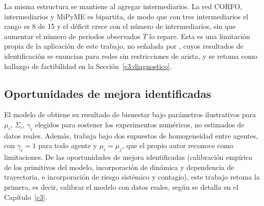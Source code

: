 La misma estructura se mantiene al agregar intermediarios. La red CORFO, intermediarios y MiPyME es bipartita, de modo que con tres intermediarios el rango es 8 de 15 y el déficit crece con el número de intermediarios, sin que aumentar el número de periodos observados $T$ lo repare. Esta es una limitación propia de la aplicación de este trabajo, no señalada por , cuyos resultados de identificación se enuncian para redes sin restricciones de arista, y se retoma como hallazgo de factibilidad en la Sección~\ref{c3:diagnostico}.

\subsection{Oportunidades de mejora identificadas}
\label{c24:oportunidades}

El modelo de  obtiene su resultado de bienestar bajo parámetros ilustrativos para $\mu_i$, $\Sigma_i$, $\gamma_i$ elegidos para sostener los experimentos numéricos, no estimados de datos reales. Además, trabaja bajo dos supuestos de homogeneidad entre agentes, con $\gamma_i = 1$ para todo agente y $\mu_i = \mu_j$, que el propio autor reconoce como limitaciones. De las oportunidades de mejora identificadas (calibración empírica de los primitivos del modelo, incorporación de dinámica y dependencia de trayectoria, e incorporación de riesgo sistémico y contagio), este trabajo retoma la primera, es decir, calibrar el modelo con datos reales, según se detalla en el Capítulo~\ref{c3}.